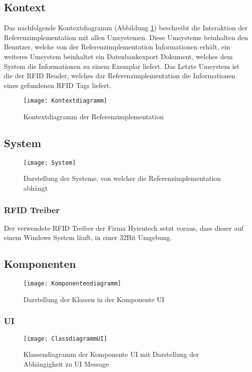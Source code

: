\subsection{Kontext}

Das nachfolgende Kontextdiagramm (Abbildung \ref{fig:Kontextdiagramm}) beschreibt die Interaktion der Referenzimplementation mit allen Umsystemen. Diese Umsysteme beinhalten den Benutzer, welche von der Referenzimplementation Informationen erhält, ein weiteres Umsystem beinhaltet ein Datenbankexport Dokument, welches dem System die Informationen zu einem Exemplar liefert. Das Letzte Umsystem ist die der RFID Reader, welches dar Referenzimplementation die Informationen eines gefundenen RFID Tags liefert.
\begin{figure}[htb]
	\centering
	\texttt{[image: Kontextdiagramm]}
	\caption{Kontextdiagramm der Referenzimplementation}
	\label{fig:Kontextdiagramm}
\end{figure}

\subsection{System}
\begin{figure}[htb]
	\centering
	\texttt{[image: System]}
	\caption{Darstellung der Systeme, von welcher die Referenzimplementation abhängt}
	\label{fig:System}
\end{figure}
\subsubsection{RFID Treiber}
Der verwendete RFID Treiber der Firma Hyientech setzt voraus, dass dieser auf einem Windows System läuft, in einer 32Bit Umgebung.

\subsection{Komponenten}
\begin{figure}[htb]
	\centering
	\texttt{[image: Komponentendiagramm]}
	\caption{Darstellung der Klassen in der Komponente UI}
	\label{fig:Components}
\end{figure}

\subsubsection{UI}
\begin{figure}[htb]
	\centering
	\texttt{[image: ClassdiagrammUI]}
	\caption{Klassendiagramm der Komponente UI mit Darstellung der Abhängigkeit zu UI Message}
	\label{fig:ClassUI}
\end{figure}
